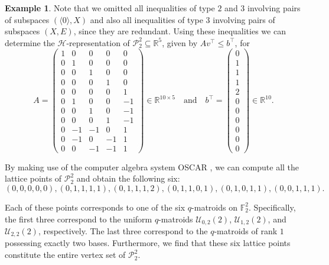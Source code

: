 \documentclass[a4paper,11pt,reqno]{amsart}
\theoremstyle{definition}
\newtheorem{example}[theorem]{{{Example}}}
\newcommand{\mU}{\mathcal{U}}
\newcommand{\mP}{\mathcal{P}}
\newcommand{\F}{\mathbb F}
\newcommand{\la}{\langle}
\newcommand{\ra}{\rangle}
\begin{document}
{\begin{example}
Note that we omitted all inequalities of type $2$ and $3$ involving pairs of subspaces $(\la0 \ra, X)$ and also all inequalities of type $3$ involving pairs of subspaces $(X,E)$, since they are redundant. Using these inequalities we can determine the $\mathcal{H}$-representation of $\mathcal{P}_2^2\subseteq\mathbb{R}^5$, given by $Av^\top\leq b^\top$, for
    \[
        A = \begin{pmatrix}
             1&0&0&0&0\\
             0&1&0&0&0\\
             0&0&1&0&0\\
             0&0&0&1&0\\
             0&0&0&0&1\\
             0&1&0&0&-1\\
             0&0&1&0&-1\\
             0&0&0&1&-1\\
             0&-1&-1&0&1\\
             0&-1&0&-1&1\\
             0&0&-1&-1&1
        \end{pmatrix}\in\mathbb{R}^{10\times 5}\quad\text{and}\quad
        b^\top = \begin{pmatrix}
            0\\
            1\\
            1\\
            1\\
            2\\
            0\\
            0\\
            0\\
            0\\
            0\\
            0
        \end{pmatrix}\in\mathbb{R}^{10}.
    \]

    By making use of the computer algebra system \textsc{OSCAR} \cite{OSCAR}, we can compute all the lattice points of $\mathcal{P}_2^2$ and obtain the following six:
    \[
        (0,0,0,0,0), (0,1,1,1,1), (0,1,1,1,2), (0,1,1,0,1), (0,1,0,1,1), (0,0,1,1,1). 
    \]

    Each of these points corresponds to one of the six $q$-matroids on $\F_2^2$. Specifically, the first three correspond to the uniform $q$-matroids $\mU_{0,2}(2)$, $\mU_{1,2}(2)$, and $\mU_{2,2}(2)$, respectively. The last three correspond to the $q$-matroids of rank $1$ possessing exactly two bases. Furthermore, we find that these six lattice points constitute the entire vertex set of $\mP_2^2$.
\end{example}

}
\end{document}
